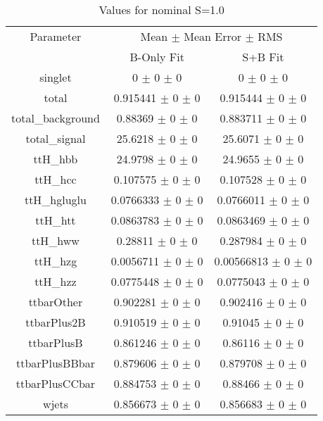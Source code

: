 \begin{table}
\centering
\caption{Values for nominal S=1.0}
\begin{tabular}{ccc}
\toprule
Parameter 	& \multicolumn{2}{c}{Mean $\pm$ Mean Error $\pm$ RMS}\\
 	& B-Only Fit & S+B Fit\\
\midrule
singlet 	& \num{0} $\pm$ \num{0} $\pm$ \num{0} 	& \num{0} $\pm$ \num{0} $\pm$ \num{0}\\
total 	& \num{0.915441} $\pm$ \num{0} $\pm$ \num{0} 	& \num{0.915444} $\pm$ \num{0} $\pm$ \num{0}\\
total\_background 	& \num{0.88369} $\pm$ \num{0} $\pm$ \num{0} 	& \num{0.883711} $\pm$ \num{0} $\pm$ \num{0}\\
total\_signal 	& \num{25.6218} $\pm$ \num{0} $\pm$ \num{0} 	& \num{25.6071} $\pm$ \num{0} $\pm$ \num{0}\\
ttH\_hbb 	& \num{24.9798} $\pm$ \num{0} $\pm$ \num{0} 	& \num{24.9655} $\pm$ \num{0} $\pm$ \num{0}\\
ttH\_hcc 	& \num{0.107575} $\pm$ \num{0} $\pm$ \num{0} 	& \num{0.107528} $\pm$ \num{0} $\pm$ \num{0}\\
ttH\_hgluglu 	& \num{0.0766333} $\pm$ \num{0} $\pm$ \num{0} 	& \num{0.0766011} $\pm$ \num{0} $\pm$ \num{0}\\
ttH\_htt 	& \num{0.0863783} $\pm$ \num{0} $\pm$ \num{0} 	& \num{0.0863469} $\pm$ \num{0} $\pm$ \num{0}\\
ttH\_hww 	& \num{0.28811} $\pm$ \num{0} $\pm$ \num{0} 	& \num{0.287984} $\pm$ \num{0} $\pm$ \num{0}\\
ttH\_hzg 	& \num{0.0056711} $\pm$ \num{0} $\pm$ \num{0} 	& \num{0.00566813} $\pm$ \num{0} $\pm$ \num{0}\\
ttH\_hzz 	& \num{0.0775448} $\pm$ \num{0} $\pm$ \num{0} 	& \num{0.0775043} $\pm$ \num{0} $\pm$ \num{0}\\
ttbarOther 	& \num{0.902281} $\pm$ \num{0} $\pm$ \num{0} 	& \num{0.902416} $\pm$ \num{0} $\pm$ \num{0}\\
ttbarPlus2B 	& \num{0.910519} $\pm$ \num{0} $\pm$ \num{0} 	& \num{0.91045} $\pm$ \num{0} $\pm$ \num{0}\\
ttbarPlusB 	& \num{0.861246} $\pm$ \num{0} $\pm$ \num{0} 	& \num{0.86116} $\pm$ \num{0} $\pm$ \num{0}\\
ttbarPlusBBbar 	& \num{0.879606} $\pm$ \num{0} $\pm$ \num{0} 	& \num{0.879708} $\pm$ \num{0} $\pm$ \num{0}\\
ttbarPlusCCbar 	& \num{0.884753} $\pm$ \num{0} $\pm$ \num{0} 	& \num{0.88466} $\pm$ \num{0} $\pm$ \num{0}\\
wjets 	& \num{0.856673} $\pm$ \num{0} $\pm$ \num{0} 	& \num{0.856683} $\pm$ \num{0} $\pm$ \num{0}\\
\bottomrule
\end{tabular}
\end{table}